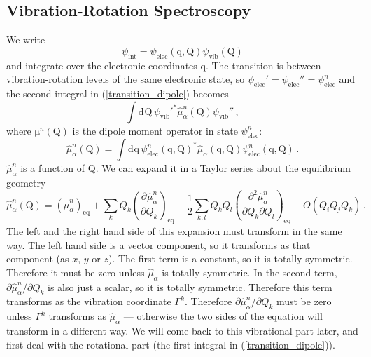 \documentclass{article}
\theoremstyle{plain}\theoremheaderfont{\normalfont\itshape}\theorembodyfont{\rmfamily}\theoremseparator{.}\newtheorem*{rem}{Remark}\newtheorem*{ex}{Example}\newtheorem*{proof}{Proof}\newtheorem*{altp}{Alternative proof}
\theoremstyle{plain}\theoremheaderfont{\normalfont\bfseries}\theorembodyfont{\rmfamily}\theoremseparator{.}\newtheorem{thm}{Theorem}[section]\newtheorem{lem}[thm]{Lemma}\newtheorem{prop}[thm]{Proposition}\newtheorem*{cor}{Corollary}\newtheorem{defn}[thm]{Definition}\newtheorem{clm}[thm]{Claim}\newtheorem{clminproof}{Claim}\newtheorem*{law}{Law}\newtheorem{pos}[thm]{Postulate}
\theoremstyle{break}\theoremheaderfont{\normalfont\itshape}\theorembodyfont{\rmfamily}\theoremseparator{.\medskip}\newtheorem*{proofskip}{Proof}\newtheorem*{exs}{Examples}\newtheorem*{rems}{Remarks}
\theoremstyle{break}\theoremheaderfont{\normalfont\bfseries}\theorembodyfont{\rmfamily}\theoremseparator{.\medskip}\newtheorem{lemskip}[thm]{Lemma}\newtheorem{defnskip}[thm]{Definition}\newtheorem{propskip}[thm]{Proposition}\newtheorem{thmskip}[thm]{Theorem}
\numberwithin{equation}{section}
\newcommand{\dd}[2][]{\mathrm{d}^{#1} #2\,}
\newcommand{\pdv}[3][]{\frac{\partial^{#1} #2}{{\partial #3}^{#1}}}
\newcommand{\vb}[1]{\bm{\mathrm{#1}}}
\begin{document}
    \subsection{Vibration-Rotation Spectroscopy}
    We write
    \begin{equation}
        \psi_{\text{int}}=\psi_{\text{elec}}(\vb{q},\vb{Q})\psi_{\text{vib}}(\vb{Q})
    \end{equation}
    and integrate over the electronic coordinates \(\vb{q}\). The transition is between vibration-rotation levels of the same electronic state, so \(\psi_{\text{elec}}'=\psi_{\text{elec}}''=\psi_{\text{elec}}^n\) and the second integral in (\ref{transition_dipole}) becomes
    \begin{equation}
        \int\dd{\vb{Q}}{\psi_{\text{vib}}'}^*\hat{\mu}_\alpha^n(\vb{Q})\psi_{\text{vib}}''\,,
    \end{equation}
    where \(\vb{\mu}^n(\vb{Q})\) is the dipole moment operator in state \(\psi_{\text{elec}}^{n}\):
    \begin{equation}
        \hat{\mu}_\alpha^n(\vb{Q})=\int\dd{\vb{q}}\psi^n_{\text{elec}}(\vb{q},\vb{Q})^*\hat{\mu}_\alpha(\vb{q},\vb{Q})\psi_{\text{elec}}^n(\vb{q},\vb{Q})\,.
    \end{equation}
    \(\hat{\mu}_\alpha^n\) is a function of \(\vb{Q}\). We can expand it in a Taylor series about the equilibrium geometry
    \begin{equation}
        \hat{\mu}_\alpha^n(\vb{Q})=(\hat{\mu}_\alpha^n)_{\text{eq}}+\sum_kQ_k\left(\pdv{\hat{\mu}_\alpha^n}{Q_k}\right)_{\text{eq}}+\frac{1}{2}\sum_{k,l}Q_kQ_l\left(\frac{\partial^2 \hat{\mu}_\alpha^n}{\partial Q_k\partial Q_l}\right)_{\text{eq}}+O(Q_iQ_jQ_k)\,.
    \end{equation}
    The left and the right hand side of this expansion must transform in the same way. The left hand side is a vector component, so it transforms as that component (as \(x\), \(y\) or \(z\)). The first term is a constant, so it is totally symmetric. Therefore it must be zero unless \(\hat{\mu}_\alpha\) is totally symmetric. In the second term, \(\partial\hat{\mu}_\alpha^n/\partial Q_k\) is also just a scalar, so it is totally symmetric. Therefore this term transforms as the vibration coordinate \(\Gamma^k\). Therefore \(\partial\hat{\mu}_\alpha^n/\partial Q_k\) must be zero unless \(\Gamma^k\) transforms as \(\hat{\mu}_\alpha\) --- otherwise the two sides of the equation will transform in a different way. We will come back to this vibrational part later, and first deal with the rotational part (the first integral in (\ref{transition_dipole})).
\end{document}
